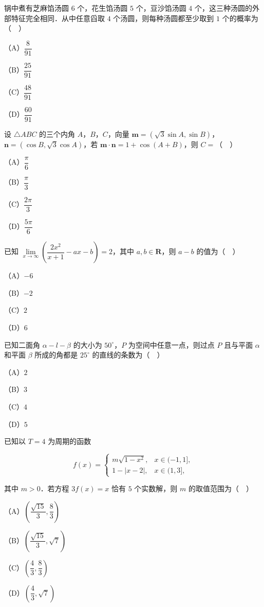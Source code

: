 \begin{question}
锅中煮有芝麻馅汤圆 $6$ 个，花生馅汤圆 $5$ 个，豆沙馅汤圆 $4$ 个，这三种汤圆的外部特征完全相同．从中任意舀取 $4$ 个汤圆，则每种汤圆都至少取到 $1$ 个的概率为（　）

（A）$\dfrac8{91}$

（B）$\dfrac{25}{91}$

（C）$\dfrac{48}{91}$

（D）$\dfrac{60}{91}$

\end{question}
\begin{question}
设 $\triangle ABC$ 的三个内角 $A$，$B$，$C$，向量 $\boldsymbol m=(\sqrt3\sin A,\sin B)$，$\boldsymbol n=(\cos B,\sqrt3\cos A)$，若 $\boldsymbol m\cdot\boldsymbol n=1+\cos(A+B)$，则 $C=$（　）

（A）$\dfrac\pi6$

（B）$\dfrac\pi3$

（C）$\dfrac{2\pi}3$

（D）$\dfrac{5\pi}6$

\end{question}
\begin{question}
已知 $\lim\limits_{x\to\infty}\left(\dfrac{2x^2}{x+1}-ax-b\right)=2$，其中 $a,b\in\mathbf R$，则 $a-b$ 的值为（　）

（A）$-6$

（B）$-2$

（C）$2$

（D）$6$

\end{question}
\begin{question}
已知二面角 $\alpha-l-\beta$ 的大小为 $50^\circ$，$P$ 为空间中任意一点，则过点 $P$ 且与平面 $\alpha$ 和平面 $\beta$ 所成的角都是 $25^\circ$ 的直线的条数为（　）

（A）$2$

（B）$3$

（C）$4$

（D）$5$

\end{question}
\begin{question}
已知以 $T=4$ 为周期的函数

\nopagebreak[4]
\[f(x)=\begin{cases}m\sqrt{1-x^2},&x\in(-1,1],\\ 1-|x-2|,&x\in(1,3],\end{cases}\]

其中 $m>0$．若方程 $3f(x)=x$ 恰有 $5$ 个实数解，则 $m$ 的取值范围为（　）

（A）$\left(\dfrac{\sqrt{15}}3,\dfrac83\right)$

（B）$\left(\dfrac{\sqrt{15}}3,\sqrt7\right)$

（C）$\left(\dfrac43,\dfrac83\right)$

（D）$\left(\dfrac43,\sqrt7\right)$

\end{question}


